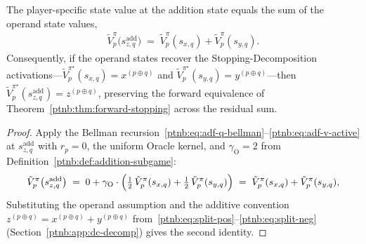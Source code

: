 \begin{proposition}\label{ptnb:prop:addition-equivalence}
The player-specific state value at the addition state equals the sum of the operand state values,
\begin{align}
    \tilde V_p^{\pi}\bigl(s_{z,q}^{\mathrm{add}}\bigr)
    \;=\;
    \tilde V_p^{\pi}(s_{x,q}) + \tilde V_p^{\pi}(s_{y,q}).
\end{align}
Consequently, if the operand states recover the Stopping-Decomposition activations---$\tilde
    V_p^{\pi^\star}(s_{x,q}) = x^{(p\oplus q)}$ and $\tilde V_p^{\pi^\star}(s_{y,q}) = y^{(p\oplus
    q)}$---then $\tilde V_p^{\pi^\star}(s_{z,q}^{\mathrm{add}}) = z^{(p\oplus q)}$, preserving the
forward equivalence of Theorem~\ref{ptnb:thm:forward-stopping} across the residual sum.\end{proposition}

\begin{proof}
Apply the Bellman recursion~\eqref{ptnb:eq:adf-q-bellman}--\eqref{ptnb:eq:adf-v-active} at
$s_{z,q}^{\mathrm{add}}$ with $r_p = 0$, the uniform Oracle kernel, and $\gamma_{\mathrm{O}} = 2$
from Definition~\ref{ptnb:def:addition-subgame}:
\begin{align}
    \tilde V_p^{\pi}\bigl(s_{z,q}^{\mathrm{add}}\bigr)
    \;=\; 0 + \gamma_{\mathrm{O}} \cdot \Bigl(\tfrac{1}{2}\,\tilde V_p^{\pi}(s_{x,q}) +
    \tfrac{1}{2}\,\tilde V_p^{\pi}(s_{y,q})\Bigr)
    \;=\; \tilde V_p^{\pi}(s_{x,q}) + \tilde V_p^{\pi}(s_{y,q}),
\end{align}
Substituting the operand assumption and the additive convention $z^{(p\oplus q)}=
 x^{(p\oplus q)}+y^{(p\oplus q)}$ from~\eqref{ptnb:eq:split-pos}--\eqref{ptnb:eq:split-neg}
(Section~\ref{ptnb:app:dc-decomp}) gives the second identity.
\end{proof}

